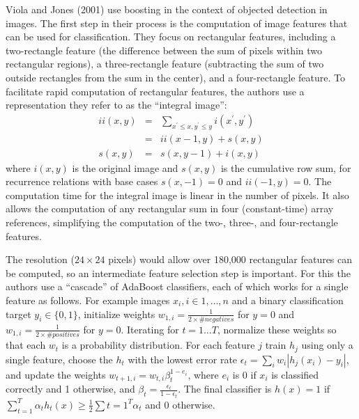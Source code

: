 \documentclass[12pt,letterpaper]{article}
\begin{document}

Viola and Jones (2001) use boosting in the context of objected detection in images. The first step in their process is the computation of image features that can be used for classification. They focus on rectangular features, including a two-rectangle feature (the difference between the sum of pixels within two rectangular regions), a three-rectangle feature (subtracting the sum of two outside rectangles from the sum in the center), and a four-rectangle feature. To facilitate rapid computation of rectangular features, the authors use a representation they refer to as the ``integral image'':
\begin{eqnarray*}
ii(x, y) &=& \sum_{x^{\prime} \leq x, y^{\prime} \leq y} i(x^{\prime}, y^{\prime}) \\
&=& ii(x-1, y) + s(x, y) \\
s(x,y) &=& s(x, y-1) + i(x,y)
\end{eqnarray*}
where $i(x,y)$ is the original image and $s(x,y)$ is the cumulative row sum, for recurrence relations with base cases $s(x,-1)=0$ and $ii(-1,y)=0$. The computation time for the integral image is linear in the number of pixels. It also allows the computation of any rectangular sum in four (constant-time) array references, simplifying the computation of the two-, three-, and four-rectangle features. 

The resolution ($24 \times 24$ pixels) would allow over 180,000 rectangular features can be computed, so an intermediate feature selection step is important. For this the authors use a ``cascade'' of AdaBoost classifiers, each of which works for a single feature as follows. For example images $x_i, i \in 1,\ldots,n$ and a binary classification target $y_i\in \{0,1\}$, initialize weights $w_{1,i}=\frac{1}{2\times \#negatives}$ for $y=0$ and $w_{1,i}=\frac{1}{2\times \#positives}$ for $y=0$. Iterating for $t=1\ldots T$,  normalize these weights so that each $w_t$ is a probability distribution. For each feature $j$ train $h_j$ using only a single feature, choose the $h_t$ with the lowest error rate $\epsilon_t = \sum_i w_i |h_j(x_i)-y_i|$, and update the weights $w_{t+1,i}=w_{t,i} \beta_t^{1-e_i}$, where $e_i$ is 0 if $x_i$ is classified correctly and 1 otherwise, and $\beta_t = \frac{\epsilon_t}{1-\epsilon_t}$. The final classifier is $h(x)=1$ if $\sum_{t=1}^T \alpha_t h_t (x) \geq \frac{1}{2} \sum{t=1}^T \alpha_t$ and 0 otherwise. 
\end{document}
